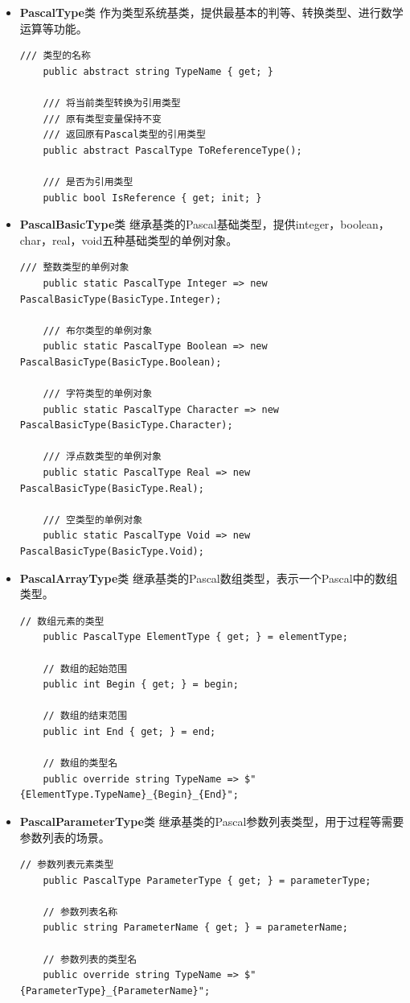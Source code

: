 \documentclass[../main.tex]{subfiles}
\begin{document}
\begin{itemize}
    \item \textbf{PascalType}类
作为类型系统基类，提供最基本的判等、转换类型、进行数学运算等功能。

\begin{lstlisting}[style=csharp]
    /// 类型的名称
    public abstract string TypeName { get; }

    /// 将当前类型转换为引用类型
    /// 原有类型变量保持不变
    /// 返回原有Pascal类型的引用类型
    public abstract PascalType ToReferenceType();

    /// 是否为引用类型
    public bool IsReference { get; init; }
\end{lstlisting}

\item \textbf{PascalBasicType}类
继承基类的Pascal基础类型，提供integer，boolean，char，real，void五种基础类型的单例对象。

\begin{lstlisting}[style=csharp]
    /// 整数类型的单例对象
    public static PascalType Integer => new PascalBasicType(BasicType.Integer);

    /// 布尔类型的单例对象
    public static PascalType Boolean => new PascalBasicType(BasicType.Boolean);

    /// 字符类型的单例对象
    public static PascalType Character => new PascalBasicType(BasicType.Character);

    /// 浮点数类型的单例对象
    public static PascalType Real => new PascalBasicType(BasicType.Real);

    /// 空类型的单例对象
    public static PascalType Void => new PascalBasicType(BasicType.Void);
\end{lstlisting}

\item \textbf{PascalArrayType}类
继承基类的Pascal数组类型，表示一个Pascal中的数组类型。

\begin{lstlisting}[style=csharp]
    // 数组元素的类型
    public PascalType ElementType { get; } = elementType;

    // 数组的起始范围
    public int Begin { get; } = begin;

    // 数组的结束范围
    public int End { get; } = end;

    // 数组的类型名
    public override string TypeName => $"{ElementType.TypeName}_{Begin}_{End}";
\end{lstlisting}

\item \textbf{PascalParameterType}类
继承基类的Pascal参数列表类型，用于过程等需要参数列表的场景。

\begin{lstlisting}[style=csharp]
    // 参数列表元素类型
    public PascalType ParameterType { get; } = parameterType;

    // 参数列表名称
    public string ParameterName { get; } = parameterName;

    // 参数列表的类型名
    public override string TypeName => $"{ParameterType}_{ParameterName}";
\end{lstlisting}
\end{itemize}
\end{document}
